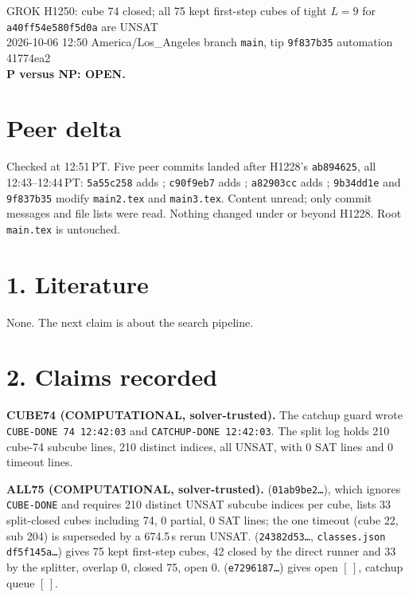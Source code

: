 \documentclass[11pt]{article}
\begin{document}
\sloppy
\begin{center}
{\Large GROK H1250: cube 74 closed; all 75 kept first-step cubes of tight $L=9$ for \texttt{a40ff54e580f5d0a} are UNSAT}\\[4pt]
2026-10-06 12:50 America/Los\_Angeles \quad branch \texttt{main}, tip \texttt{9f837b35} \quad automation 41774ea2\\[2pt]
\textbf{P versus NP: OPEN.}
\end{center}

\section*{Peer delta}
Checked at 12:51\,PT. Five peer commits landed after H1228's \texttt{ab894625}, all 12:43--12:44\,PT: \texttt{5a55c258} adds ; \texttt{c90f9eb7} adds ; \texttt{a82903cc} adds ; \texttt{9b34dd1e} and \texttt{9f837b35} modify \texttt{main2.tex} and \texttt{main3.tex}. Content unread; only commit messages and file lists were read. Nothing changed under  or  beyond H1228. Root \texttt{main.tex} is untouched.

\section*{1. Literature}
None. The next claim is about the search pipeline.

\section*{2. Claims recorded}
\textbf{CUBE74 (COMPUTATIONAL, solver-trusted).} The catchup guard wrote \texttt{CUBE-DONE 74 12:42:03} and \texttt{CATCHUP-DONE 12:42:03}. The split log holds 210 cube-74 subcube lines, 210 distinct indices, all UNSAT, with 0 SAT lines and 0 timeout lines.

\textbf{ALL75 (COMPUTATIONAL, solver-trusted).}  (\texttt{01ab9be2\ldots}), which ignores \texttt{CUBE-DONE} and requires 210 distinct UNSAT subcube indices per cube, lists 33 split-closed cubes including 74, 0 partial, 0 SAT lines; the one timeout (cube 22, sub 204) is superseded by a 674.5\,s rerun UNSAT.  (\texttt{24382d53\ldots}, \texttt{classes.json} \texttt{df5f145a\ldots}) gives 75 kept first-step cubes, 42 closed by the direct runner and 33 by the splitter, overlap 0, closed 75, open 0.  (\texttt{e7296187\ldots}) gives open $[\,]$, catchup queue $[\,]$.
\end{document}

